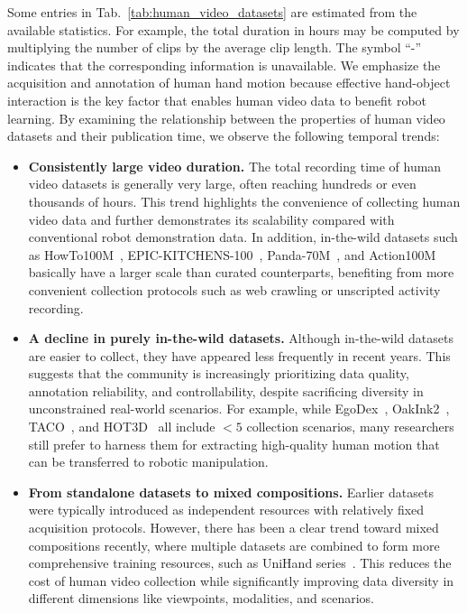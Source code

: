 \documentclass[Afour,sageh,times]{sagej}
\begin{document}
Some entries in Tab.~\ref{tab:human_video_datasets} are estimated from the available statistics. For example, the total duration in hours may be computed by multiplying the number of clips by the average clip length. The symbol ``-'' indicates that the corresponding information is unavailable. We emphasize the acquisition and annotation of human hand motion because effective hand-object interaction is the key factor that enables human video data to benefit robot learning. By examining the relationship between the properties of human video datasets and their publication time, we observe the following temporal trends:
\begin{itemize}[leftmargin=1em]
    \setlength{\parskip}{0pt}
    \item \textbf{Consistently large video duration.} The total recording time of human video datasets is generally very large, often reaching hundreds or even thousands of hours. This trend highlights the convenience of collecting human video data and further demonstrates its scalability compared with conventional robot demonstration data. In addition, in-the-wild datasets such as HowTo100M~\citep{miech2019howto100m}, EPIC-KITCHENS-100~\citep{damen2020rescaling}, Panda-70M~\citep{chen2024panda}, and Action100M~\citep{chen2026action100m} basically have a larger scale than curated counterparts, benefiting from more convenient collection protocols such as web crawling or unscripted activity recording.
    \item \textbf{A decline in purely in-the-wild datasets.} Although in-the-wild datasets are easier to collect, they have appeared less frequently in recent years. This suggests that the community is increasingly prioritizing data quality, annotation reliability, and controllability, despite sacrificing diversity in unconstrained real-world scenarios. For example, while EgoDex~\citep{hoque2025egodex}, OakInk2~\citep{zhan2024oakink2}, TACO~\citep{liu2024taco}, and HOT3D~\citep{banerjee2024hot3d} all include $<5$ collection scenarios, many researchers still prefer to harness them for extracting high-quality human motion that can be transferred to robotic manipulation.
    \item \textbf{From standalone datasets to mixed compositions.} Earlier datasets were typically introduced as independent resources with relatively fixed acquisition protocols. However, there has been a clear trend toward mixed compositions recently, where multiple datasets are combined to form more comprehensive training resources, such as UniHand series~\citep{luo2025being,luo2026joint,luo2026being}. This reduces the cost of human video collection while significantly improving data diversity in different dimensions like viewpoints, modalities, and scenarios.

\end{itemize}
\end{document}
